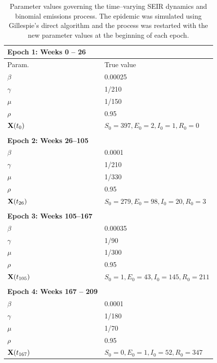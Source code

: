 \begin{table}[htbp]
	\centering
	\begin{tabular}{ll}
		\textbf{Epoch 1: Weeks 0 -- 26} & \\
		\hline\hline
		Param. & True value \\ 
		\hline
		$ \beta $ &  0.00025 \\
		$ \gamma $ & 1/210\\
		$ \mu $ &  1/150 \\ 
		$ \rho $ &  0.95 \\
		$ \mathbf{X}(t_0) $ &  $ S_0 = 397, E_0 = 2, I_0 = 1, R_0 =0 $  \\ 
		\hline	
		&\\
		\textbf{Epoch 2: Weeks 26--105} & \\
		\hline\hline
		$ \beta $ &  0.0001 \\
		$ \gamma $ & 1/210\\
		$ \mu $ &  1/330 \\ 
		$ \rho $ &  0.95 \\
		$ \mathbf{X}(t_{26}) $ &  $ S_0 = 279, E_0 = 98, I_0 = 20, R_0 =3 $  \\ 
		\hline
		&\\
		\textbf{Epoch 3: Weeks 105--167} & \\
		\hline\hline
		$ \beta $ &  0.00035 \\
		$ \gamma $ & 1/90\\
		$ \mu $ &  1/300 \\ 
		$ \rho $ &  0.95 \\
		$ \mathbf{X}(t_{105}) $ &  $ S_0 = 1, E_0 = 43, I_0 = 145, R_0 =211 $  \\ 
		\hline
		&\\
		\textbf{Epoch 4: Weeks 167 -- 209} & \\
		\hline\hline
		$ \beta $ &  0.0001 \\
		$ \gamma $ & 1/180\\
		$ \mu $ &  1/70 \\ 
		$ \rho $ &  0.95 \\
		$ \mathbf{X}(t_{167}) $ &  $ S_0 = 0, E_0 = 1, I_0 = 52, R_0 = 347 $\\
		\hline
	\end{tabular}
	\caption[Simulation 2 SEIR model parameters.]{Parameter values governing the time--varying SEIR dynamics and binomial emissions process. The epidemic was simulated using Gillespie's direct algorithm and the process was restarted with the new parameter values at the beginning of each epoch.}
	\label{tab:misspec_sim_params}
\end{table}

